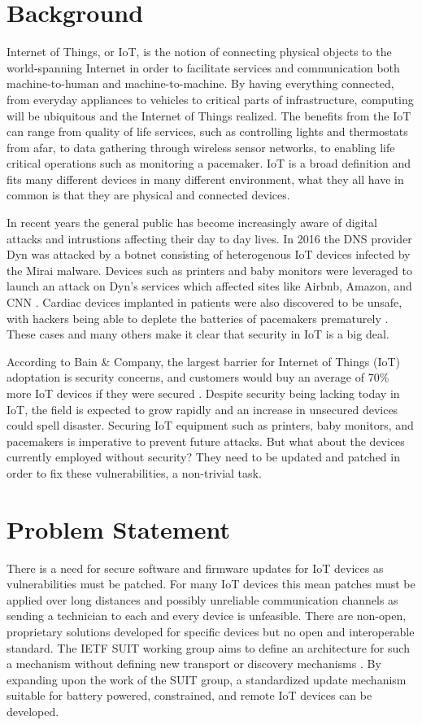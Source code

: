 \documentclass[0-thesis.tex]{subfiles}
\begin{document}
\section{Background}
Internet of Things, or IoT, is the notion of connecting physical objects to the
world-spanning Internet in order to facilitate services and communication both
machine-to-human and machine-to-machine. By having everything connected, from everyday
appliances to vehicles to critical parts of infrastructure, computing will be ubiquitous
and the Internet of Things realized. The benefits from the IoT can range from quality of
life services, such as controlling lights and thermostats from afar, to data gathering
through wireless sensor networks, to enabling life critical operations such as monitoring
a pacemaker. IoT is a broad definition and fits many different devices in many different
environment, what they all have in common is that they are physical and connected devices.

In recent years the general public has become increasingly aware of digital attacks and
intrustions affecting their day to day lives. In 2016 the DNS provider Dyn was attacked by
a botnet consisting of heterogenous IoT devices infected by the Mirai malware. Devices
such as printers and baby monitors were leveraged to launch an attack on Dyn's services
which affected sites like Airbnb, Amazon, and CNN \parencite{perlroth_2016}. Cardiac
devices implanted in patients were also discovered to be unsafe, with hackers being able
to deplete the batteries of pacemakers prematurely \parencite{hern_2017}. These cases and
many others make it clear that security in IoT is a big deal.

According to Bain \& Company, the largest barrier for Internet of Things (IoT) adoptation
is security concerns, and customers would buy an average of 70\% more IoT devices if they
were secured \parencite{ali_bosche_ford_2018}. Despite security being lacking today in
IoT, the field is expected to grow rapidly and an increase in unsecured devices could
spell disaster. Securing IoT equipment such as printers, baby monitors, and pacemakers is
imperative to prevent future attacks. But what about the devices currently employed
without security? They need to be updated and patched in order to fix these
vulnerabilities, a non-trivial task.

\section{Problem Statement}
There is a need for secure software and firmware updates for IoT devices as
vulnerabilities must be patched. For many IoT devices this mean patches must be applied
over long distances and possibly unreliable communication channels as sending a technician
to each and every device is unfeasible. There are non-open, proprietary solutions
developed for specific devices but no open and interoperable standard. The IETF SUIT
working group aims to define an architecture for such a mechanism without defining new
transport or discovery mechanisms \parencite{suit}. By expanding upon the work of the SUIT
group, a standardized update mechanism suitable for battery powered, constrained, and
remote IoT devices can be developed.
\end{document}
